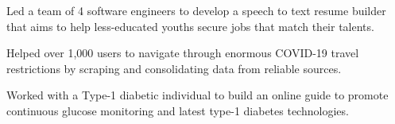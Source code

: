 \documentclass[]{Klement_Resume}
\begin{document}
\begin{minipage}[t]{0.66\textwidth}
\begin{tightemize}
\item Led a team of 4 software engineers to develop a speech to text resume builder that aims to help less-educated youths secure jobs that match their talents.
\end{tightemize}
\sectionsep

\begin{tightemize}
\item Helped over 1,000 users to navigate through enormous COVID-19 travel restrictions by scraping and consolidating data from reliable sources.
\end{tightemize}
\sectionsep

\begin{tightemize}
\item Worked with a Type-1 diabetic individual to build an online guide to promote continuous glucose monitoring and latest type-1 diabetes technologies.
\end{tightemize}
\sectionsep

\end{minipage} 
\hfill
\end{document}
